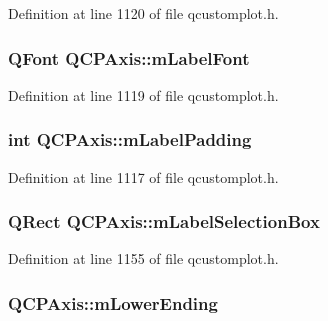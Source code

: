 Definition at line 1120 of file qcustomplot.\-h.

\hypertarget{class_q_c_p_axis_a37442d470e30e19b81ecaf979a34d046}{
\subsubsection[{m\-Label\-Font}]{\setlength{\rightskip}{0pt plus 5cm}Q\-Font Q\-C\-P\-Axis\-::m\-Label\-Font\hspace{0.3cm}{\ttfamily [protected]}}}\label{class_q_c_p_axis_a37442d470e30e19b81ecaf979a34d046}


Definition at line 1119 of file qcustomplot.\-h.

\hypertarget{class_q_c_p_axis_ae392a7c1a88a58765a7ed899642d248a}{
\subsubsection[{m\-Label\-Padding}]{\setlength{\rightskip}{0pt plus 5cm}int Q\-C\-P\-Axis\-::m\-Label\-Padding\hspace{0.3cm}{\ttfamily [protected]}}}\label{class_q_c_p_axis_ae392a7c1a88a58765a7ed899642d248a}


Definition at line 1117 of file qcustomplot.\-h.

\hypertarget{class_q_c_p_axis_a14fbf65daf2c38cbb0f2c4278a7929dd}{
\subsubsection[{m\-Label\-Selection\-Box}]{\setlength{\rightskip}{0pt plus 5cm}Q\-Rect Q\-C\-P\-Axis\-::m\-Label\-Selection\-Box\hspace{0.3cm}{\ttfamily [protected]}}}\label{class_q_c_p_axis_a14fbf65daf2c38cbb0f2c4278a7929dd}


Definition at line 1155 of file qcustomplot.\-h.

\hypertarget{class_q_c_p_axis_ab02ff8f6777721a0e4a42db403cc906b}{
\subsubsection[{m\-Lower\-Ending}]{ Q\-C\-P\-Axis\-::m\-Lower\-Ending\hspace{0.3cm}{\ttfamily [protected]}}}\label{class_q_c_p_axis_ab02ff8f6777721a0e4a42db403cc906b}


